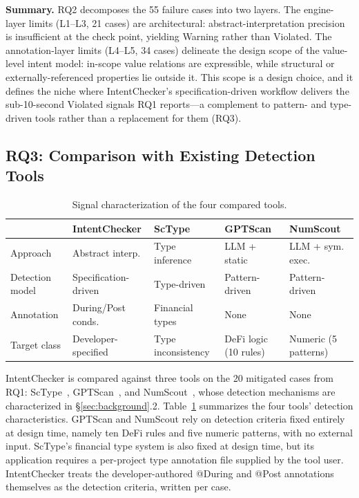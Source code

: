 \documentclass[pdflatex,sn-basic]{sn-jnl}%
\theoremstyle{thmstyleone}%
\theoremstyle{thmstyletwo}%
\theoremstyle{thmstylethree}%
\begin{document}
\smallskip
\noindent\textbf{Summary.}
RQ2 decomposes the 55 failure cases into two layers. The engine-layer limits (L1--L3, 21 cases) are architectural: abstract-interpretation precision is insufficient at the check point, yielding Warning rather than Violated. The annotation-layer limits (L4--L5, 34 cases) delineate the design scope of the value-level intent model: in-scope value relations are expressible, while structural or externally-referenced properties lie outside it. This scope is a design choice, and it defines the niche where IntentChecker's specification-driven workflow delivers the sub-10-second Violated signals RQ1 reports---a complement to pattern- and type-driven tools rather than a replacement for them (RQ3).

\subsection{RQ3: Comparison with Existing Detection Tools}\label{sec:rq3}

\begin{table}[t]
\centering
\caption{Signal characterization of the four compared tools.}
\label{tab:rq3-signal}
\small
\begin{tabular}{@{}lllll@{}}
\toprule
 & IntentChecker & ScType & GPTScan & NumScout \\
\midrule
Approach & Abstract interp. & Type inference & LLM + static & LLM + sym. exec. \\
Detection model & Specification-driven & Type-driven & Pattern-driven & Pattern-driven \\
Annotation & During/Post conds. & Financial types & None & None \\
Target class & Developer-specified & Type inconsistency & DeFi logic (10 rules) & Numeric (5 patterns) \\
\bottomrule
\end{tabular}
\end{table}

IntentChecker is compared against three tools on the 20 mitigated cases from RQ1: ScType~\citep{sctype}, GPTScan~\citep{gptscan}, and NumScout~\citep{numscout}, whose detection mechanisms are characterized in \S\ref{sec:background}.2.
Table~\ref{tab:rq3-signal} summarizes the four tools' detection characteristics. GPTScan and NumScout rely on detection criteria fixed entirely at design time, namely ten DeFi rules and five numeric patterns, with no external input. ScType's financial type system is also fixed at design time, but its application requires a per-project type annotation file supplied by the tool user. IntentChecker treats the developer-authored @During and @Post annotations themselves as the detection criteria, written per case.
\end{document}
